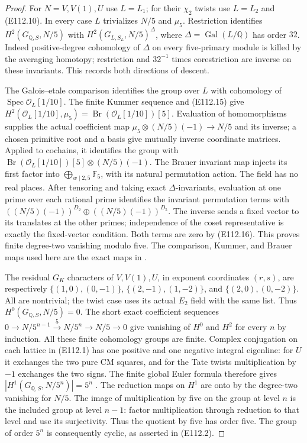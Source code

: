 \begin{proof}
For $N=V,V(1),U$ use $L=L_1$; for their $\chi_2$ twists
use $L=L_2$ and (E112.10).  In every case $L$ trivializes
$N/5$ and $\mu_5$.  Restriction identifies
$H^2(G_{\mathbb Q,S},N/5)$ with
$H^2(G_{L,S_L},N/5)^{\Delta}$, where
$\Delta=\operatorname{Gal}(L/\mathbb Q)$ has order $32$.
Indeed positive-degree cohomology of $\Delta$ on every
five-primary module is killed by the averaging homotopy;
restriction and $32^{-1}$ times corestriction are inverse
on these invariants.  This records both directions of descent.

The Galois--etale comparison identifies the group over $L$
with cohomology of $\operatorname{Spec}\mathcal O_L[1/10]$.
The finite Kummer sequence and (E112.15) give
$H^2(\mathcal O_L[1/10],\mu_5)=
\operatorname{Br}(\mathcal O_L[1/10])[5]$.
Evaluation of homomorphisms supplies the actual coefficient
map
$\mu_5\otimes (N/5)(-1)\to N/5$ and its inverse; a chosen
primitive root and a basis give mutually inverse coordinate
matrices.  Applied to cochains, it identifies the group with
$\operatorname{Br}(\mathcal O_L[1/10])[5]\otimes (N/5)(-1)$.
The Brauer invariant map injects its first factor into
$\bigoplus_{w\mid2,5}\mathbb F_5$, with its natural
permutation action.  The field has no real places.
After tensoring and taking exact $\Delta$-invariants, evaluation
at one prime over each rational prime identifies the invariant
permutation terms with
$((N/5)(-1))^{D_2}\oplus((N/5)(-1))^{D_5}$.
The inverse sends a fixed vector to its translates at the
other primes; independence of the coset representative is
exactly the fixed-vector condition.  Both terms are zero
by (E112.16).  This proves finite degree-two vanishing modulo
five.  The comparison, Kummer, and Brauer maps used here are
the exact maps in \cite[II.2.1, II.2.2(a), II.2.9 and proof]{E_MilneADT}.

The residual $G_K$ characters of $V,V(1),U$, in exponent
coordinates $(r,s)$, are respectively
$\{(1,0),(0,-1)\}$, $\{(2,-1),(1,-2)\}$, and
$\{(2,0),(0,-2)\}$.  All are nontrivial; the twist case
uses its actual $E_2$ field with the same list.
Thus $H^0(G_{\mathbb Q,S},N/5)=0$.
The short exact coefficient sequences
$0\to N/5^{n-1}\xrightarrow{5}N/5^n\to N/5\to0$
give vanishing of $H^0$ and $H^2$ for every $n$ by induction.
All these finite cohomology groups are finite.
Complex conjugation on each lattice in (E112.1) has
one positive and one negative integral eigenline: for $U$
it exchanges the two pure CM squares, and for the Tate
twists multiplication by $-1$ exchanges the two signs.
The finite global Euler formula therefore gives
$|H^1(G_{\mathbb Q,S},N/5^n)|=5^n$
\cite[I.4.15; I.5.1 and proof]{E_MilneADT}.
The reduction maps on $H^1$ are onto by the degree-two
vanishing for $N/5$.  The image of multiplication by five
on the group at level $n$ is the included group at level
$n-1$: factor multiplication through reduction to that
level and use its surjectivity.  Thus the quotient by five
has order five.  The group of order $5^n$ is consequently
cyclic, as asserted in (E112.2).


\end{proof}
